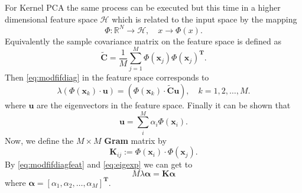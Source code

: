 \documentclass[7 pt]{article}
\begin{document}
\begin{multicols}{2}
For Kernel PCA the same process can be executed but this time in a higher dimensional feature space $\mathcal{H}$ which is related to the input space by the mapping 
\begin{equation}
\Phi : \mathbb{R}^{N} \rightarrow \mathcal{H}, \quad {x}\rightarrow \Phi({x}).
\end{equation}
Equivalently the sample covariance matrix on the feature space is defined as 
\begin{equation}
\mathbf{\tilde{C}}=\frac{1}{M}\sum_{j=1}^{M}\Phi(\mathbf{x}_{j})\Phi(\mathbf{x}_{j})^{\mathbf{T}}.
\end{equation}
Then \eqref{eq:modfifdiag} in the feature space corresponds to
\begin{equation}
\lambda(\Phi(\mathbf{x}_{k}) \cdot \mathbf{u})= (\Phi(\mathbf{x}_{k}) \cdot \mathbf{\tilde{C}u}), \quad  k=1,2,\dots,M. \label{eq:modfifdiagfeat}
\end{equation}
where $\mathbf{u}$ are the eigenvectors in the feature space.
Finally it can be shown that 
\begin{equation}
\mathbf{u}=\sum_{i}^{M}\alpha_{i}\Phi(\mathbf{x}_{i}). \label{eq:eigexp}
\end{equation}
Now, we define the $M\times M$ \textbf{Gram} matrix by
 \begin{equation}
 \mathbf{K}_{ij} := \Phi(\mathbf{x}_{i}) \cdot \Phi(\mathbf{x}_{j}).
 \end{equation}
 By \eqref{eq:modfifdiagfeat} and \eqref{eq:eigexp} we can get to 
 \begin{equation}
 M\lambda \boldsymbol{\alpha}= \boldsymbol{K\alpha} \label{eq:kereig}
 \end{equation}
 where $\boldsymbol{\alpha}=[\alpha_{1},\alpha_{2},\dots,\alpha_{M}]^{\mathbf{T}} $.
 

\end{multicols}
\end{document}
